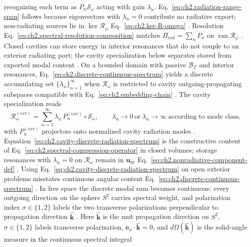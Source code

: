 recognizing each term as \(P_n\mathcal{S}_\omega\) acting with gain \(\lambda_n\).
Eq.~\eqref{eq:ch2.radiation-range-span} follows because eigenvectors with
\(\lambda_n=0\) contribute no radiative export; non-radiating sources lie in
\(\ker\mathcal{R}_\omega\) Eq.~\eqref{eq:ch2.ker-R-omega}
\cite{harrington2001}. Resolution Eq.~\eqref{eq:ch2.spectral-resolution-composition} matches
\(\Pi_{\mathrm{rad}}=\sum_n P_n\) on \(\operatorname{ran}\mathcal{R}_\omega\)
\cite{stratton1941}. Closed cavities can store energy in interior resonances that do not couple to an exterior
radiating port; the cavity specialization below separates stored from exported modal content
\cite{stratton1941}. On a bounded domain with passive \(\mathcal{B}_\Gamma\) and interior resonances,
Eq.~\eqref{eq:ch2.discrete-continuous-spectrum} yields a discrete accumulating set
\(\{\lambda_n\}_{n=1}^{\infty}\) when \(\mathcal{R}_\omega\) is restricted to cavity
outgoing-propagating subspaces compatible with Eq.~\eqref{eq:ch2.embedding-chain}
\cite{stratton1941}. The cavity specialization reads
\begin{equation}
\label{eq:ch2.cavity-discrete-radiation-spectrum}
\mathcal{R}_\omega^{(\mathrm{cav})}
=
\sum_{n=1}^{\infty}
\lambda_n\,P_n^{(\mathrm{cav})}\circ\mathcal{S}_\omega,
\qquad
\lambda_n\to 0\ \text{or}\ \lambda_n\to\infty
\ \text{according to mode class},
\end{equation}
with \(P_n^{(\mathrm{cav})}\) projectors onto normalized cavity radiation modes
\cite{stratton1941}. Equation~\eqref{eq:ch2.cavity-discrete-radiation-spectrum} is the
constructive content of Eq.~\eqref{eq:ch2.spectral-compression-operator} in closed volumes;
storage resonances with \(\lambda_n=0\) on \(\mathcal{R}_\omega\) remain in
\(\mathbf{u}_{\mathrm{nr}}\) Eq.~\eqref{eq:ch2.nonradiative-component-def}
\cite{harrington2001}. Using Eq.~\eqref{eq:ch2.cavity-discrete-radiation-spectrum} on open
exterior problems misstates continuous angular content
Eq.~\eqref{eq:ch2.discrete-continuous-spectrum} \cite{stratton1941}.
In free space the discrete modal sum becomes continuous: every outgoing direction on the sphere
$S^2$ carries spectral weight, and polarization index $\sigma\in\{1,2\}$ labels the two
transverse polarizations perpendicular to propagation direction $\hat{\mathbf{k}}$
\cite{stratton1941}. Here $\hat{\mathbf{k}}$ is the unit propagation direction on $S^2$,
$\sigma\in\{1,2\}$ labels transverse polarization, $\mathbf{e}_\sigma\cdot\hat{\mathbf{k}}=0$,
and $d\Omega(\hat{\mathbf{k}})$ is the solid-angle measure in the continuous spectral integral
